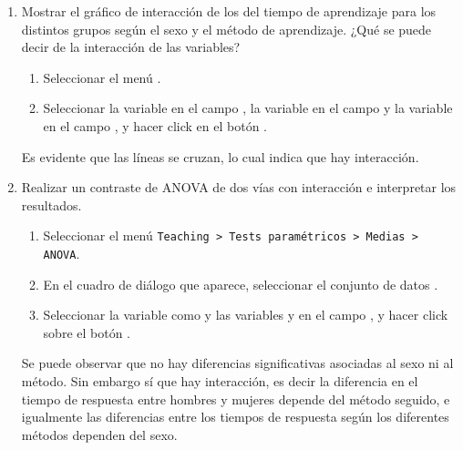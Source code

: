 \begin{enumerate}[leftmargin=*]
\begin{enumerate}
\item Mostrar el gráfico de interacción de los del tiempo de aprendizaje para los distintos grupos según el sexo y el método
de aprendizaje. 
¿Qué se puede decir de la interacción de las variables?
\begin{indicacion}
\begin{enumerate}
\item Seleccionar el menú .
\item Seleccionar la variable  en el campo , la variable
 en el campo  y la variable  en el campo , y hacer click en el botón .
\end{enumerate}
Es evidente que las líneas se cruzan, lo cual indica que hay interacción.
\end{indicacion}

\item Realizar un contraste de ANOVA de dos vías con interacción e interpretar los resultados.
\begin{indicacion}
\begin{enumerate}
\item Seleccionar el menú \texttt{Teaching > Tests paramétricos > Medias > ANOVA}.
\item En el cuadro de diálogo que aparece, seleccionar el conjunto de datos .
\item Seleccionar la variable  como  y las variables
 y  en el campo , y hacer click sobre el botón
.
\end{enumerate}
Se puede observar que no hay diferencias significativas asociadas al sexo ni al método. 
Sin embargo sí que hay interacción, es decir la diferencia en el tiempo de respuesta entre hombres y mujeres depende del
método seguido, e igualmente las diferencias entre los tiempos de respuesta según los diferentes métodos dependen del
sexo.
\end{indicacion}


\end{enumerate}
\end{enumerate}
